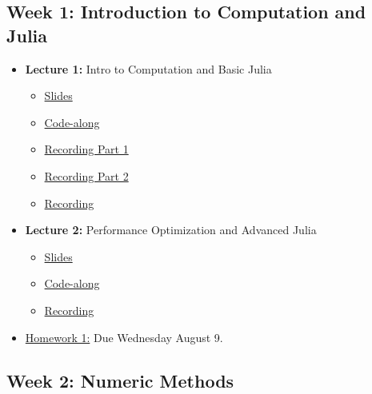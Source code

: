 \documentclass[
]{book}
\providecommand{\tightlist}{%
  \setlength{\itemsep}{0pt}\setlength{\parskip}{0pt}}
\begin{document}
\hypertarget{week-1-introduction-to-computation-and-julia}{%
\subsection{Week 1: Introduction to Computation and Julia}\label{week-1-introduction-to-computation-and-julia}}

\begin{itemize}
\tightlist
\item
  \textbf{Lecture 1:} Intro to Computation and Basic Julia

  \begin{itemize}
  \item
    \href{https://kevinghunt.github.io/ComputationCamp/lectures/Lecture1.html}{Slides}
  \item
    \href{https://kevinghunt.github.io/ComputationCamp/codealongs/CodeAlong1.jl}{Code-along}
  \item
    \href{https://uwmadison.zoom.us/rec/share/YbH5nwK8MFfdrG_79ab21fIChvq_GLK2G0cj1PuRpy29LgDW2ddl46KoGUvMzWoz.uN0dl820cFXMQ54_}{Recording Part 1}
  \item
    \href{https://uwmadison.zoom.us/rec/share/grQK03ljFWrQB5hBKKgoAVy9BuR5hg85PgyVvQJrXqJ5olG1fCe9vh336wh_L_yH.8-wkiBg4GIsDT3eC}{Recording Part 2}
  \item
    \href{-\%20https://uwmadison.zoom.us/rec/share/ANmR1Qr-iDoAxMOItHY9zgQk41_bbABcPN4eD3mVE5OVLvhzcXr80yBSEjEi8Dc.V7Hy_3yeHQm84srl}{Recording}
  \end{itemize}
\item
  \textbf{Lecture 2:} Performance Optimization and Advanced Julia

  \begin{itemize}
  \tightlist
  \item
    \href{https://kevinghunt.github.io/ComputationCamp/lectures/Lecture2.html}{Slides}
  \item
    \href{https://kevinghunt.github.io/ComputationCamp/codealongs/CodeAlong2.jl}{Code-along}
  \item
    \href{https://uwmadison.zoom.us/rec/share/ANmR1Qr-iDoAxMOItHY9zgQk41_bbABcPN4eD3mVE5OVLvhzcXr80yBSEjEi8Dc.V7Hy_3yeHQm84srl}{Recording}
  \end{itemize}
\item
  \href{https://kevinghunt.github.io/ComputationCamp/homeworks/homework1.html}{Homework 1:} Due Wednesday August 9.
\end{itemize}

\hypertarget{week-2-numeric-methods}{%
\subsection{Week 2: Numeric Methods}\label{week-2-numeric-methods}}
\end{document}
